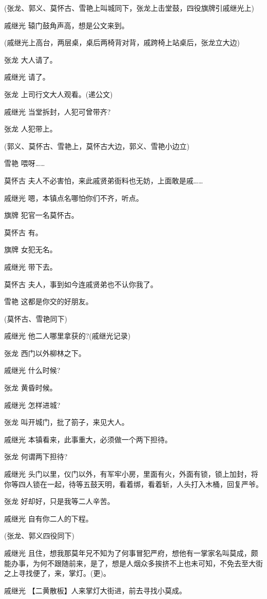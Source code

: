 (张龙、郭义、莫怀古、雪艳上叫城同下，张龙上击堂鼓，四役旗牌引戚继光上)

戚继光 辕门鼓角声高，想是公文来到。

(戚继光上高台，两层桌，桌后两椅背对背，戚跨椅上站桌后，张龙立大边)

张龙 大人请了。

戚继光 请了。

张龙 上司行文大人观看。(递公文)

戚继光 当堂拆封，人犯可曾带齐?

张龙 人犯带上。

(郭义、莫怀古、雪艳上，莫怀古大边，郭义、雪艳小边立)

雪艳 喂呀\ldots{}\ldots{}

莫怀古 夫人不必害怕，来此戚贤弟衙料也无妨，上面敢是戚\ldots{}\ldots{}

戚继光 嗯，本镇点名哪怕你们不齐，听点。

旗牌 犯官一名莫怀古。

莫怀古 有。

旗牌 女犯无名。

戚继光 带下去。

莫怀古 夫人，事到如今连戚贤弟也不认你我了。

雪艳 这都是你交的好朋友。

(莫怀古、雪艳同下)

戚继光 他二人哪里拿获的?(戚继光记录)

张龙 西门以外柳林之下。

戚继光 什么时候?

张龙 黄昏时候。

戚继光 怎样进城?

张龙 叫开城门，批了箚子，来见大人。

戚继光 本镇看来，此事重大，必须做一个两下担待。

张龙 何谓两下担待?

戚继光
头门以里，仪门以外，有军牢小房，里面有火，外面有锁，锁上加封，将你等四人锁在一起，待等五鼓天明，看着绑，看着斩，人头打入木桶，回复严爷。

张龙 好却好，只是我等二人辛苦。

戚继光 自有你二人的下程。

(张龙、郭义四役同下)

戚继光
且住，想我那莫年兄不知为了何事冒犯严府，想他有一掌家名叫莫成，颇能办事，为何不跟随前来，是了，想是人烟众多挨挤不上也未可知，不免去至大街之上寻找便了，来，掌灯。(更)。

戚继光 【二黄散板】人来掌灯大街进，前去寻找小莫成。

